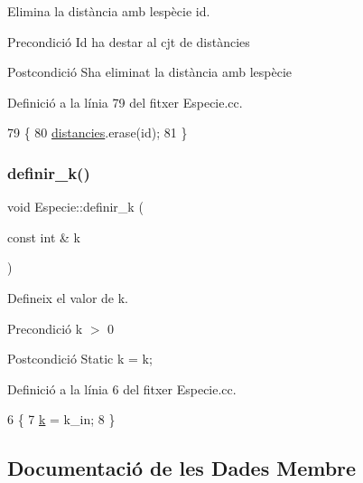 Elimina la distància amb l\textquotesingle{}espècie id. 

\begin{DoxyPrecond}{Precondició}
Id ha d\textquotesingle{}estar al cjt de distàncies 
\end{DoxyPrecond}
\begin{DoxyPostcond}{Postcondició}
S\textquotesingle{}ha eliminat la distància amb l\textquotesingle{}espècie 
\end{DoxyPostcond}


Definició a la línia 79 del fitxer Especie.\+cc.


\begin{DoxyCode}
79                                                \{
80     \hyperlink{class_especie_ad4bbf9359ebc17c3c7f501bc31c86509}{distancies}.erase(\textcolor{keywordtype}{id});
81 \}
\end{DoxyCode}
\mbox{\label{class_especie_a30e274da0f6d1ee4c450702a3f914ecf}} 
\subsubsection{\texorpdfstring{definir\+\_\+k()}{definir\_k()}}
{\footnotesize\ttfamily void Especie\+::definir\+\_\+k (\begin{DoxyParamCaption}\item[{const int \&}]{k }\end{DoxyParamCaption})\hspace{0.3cm}{\ttfamily [static]}}



Defineix el valor de k. 

\begin{DoxyPrecond}{Precondició}
k $>$ 0 
\end{DoxyPrecond}
\begin{DoxyPostcond}{Postcondició}
Static k = k; 
\end{DoxyPostcond}


Definició a la línia 6 del fitxer Especie.\+cc.


\begin{DoxyCode}
6                                       \{
7     \hyperlink{class_especie_a592c0ddeeebc786969f3040fbefea9df}{k} = k\_in;
8 \}
\end{DoxyCode}


\subsection{Documentació de les Dades Membre}
\mbox{\label{class_especie_ac35bb565f7346cd6317b3a8c849456d1}} 

